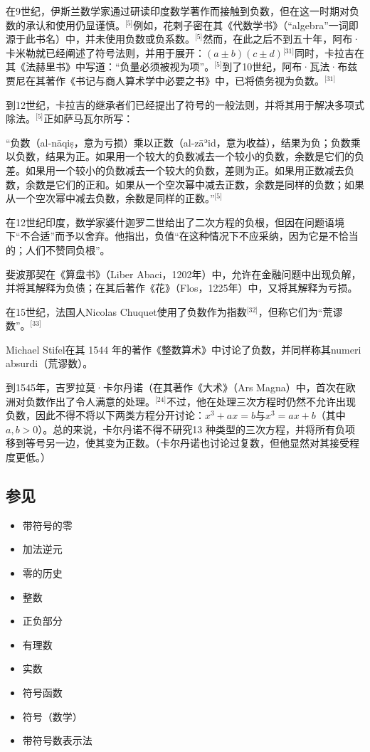 在9世纪，伊斯兰数学家通过研读印度数学著作而接触到负数，但在这一时期对负数的承认和使用仍显谨慎。\(^\text{[5]}\)例如，花剌子密在其《代数学书》（“algebra”一词即源于此书名）中，并未使用负数或负系数。\(^\text{[5]}\)然而，在此之后不到五十年，阿布·卡米勒就已经阐述了符号法则，并用于展开：$(a \pm b)(c \pm d)$\(^\text{[31]}\)同时，卡拉吉在其《法赫里书》中写道：“负量必须被视为项”。\(^\text{[5]}\)到了10世纪，阿布·瓦法·布兹贾尼在其著作《书记与商人算术学中必要之书》中，已将债务视为负数。\(^\text{[31]}\)

到12世纪，卡拉吉的继承者们已经提出了符号的一般法则，并将其用于解决多项式除法。\(^\text{[5]}\)正如萨马瓦尔所写：

“负数（al-nāqiṣ，意为亏损）乘以正数（al-zāʾid，意为收益），结果为负；负数乘以负数，结果为正。如果用一个较大的负数减去一个较小的负数，余数是它们的负差。如果用一个较小的负数减去一个较大的负数，差则为正。如果用正数减去负数，余数是它们的正和。如果从一个空次幂中减去正数，余数是同样的负数；如果从一个空次幂中减去负数，余数是同样的正数。”\(^\text{[5]}\)

在12世纪印度，数学家婆什迦罗二世给出了二次方程的负根，但因在问题语境下“不合适”而予以舍弃。他指出，负值“在这种情况下不应采纳，因为它是不恰当的；人们不赞同负根”。

斐波那契在《算盘书》（Liber Abaci，1202年）中，允许在金融问题中出现负解，并将其解释为负债；在其后著作《花》（Flos，1225年）中，又将其解释为亏损。

在15世纪，法国人Nicolas Chuquet使用了负数作为指数\(^\text{[32]}\)，但称它们为“荒谬数”。\(^\text{[33]}\)

Michael Stifel在其 1544 年的著作《整数算术》中讨论了负数，并同样称其numeri absurdi（荒谬数）。

到1545年，吉罗拉莫·卡尔丹诺（在其著作《大术》（Ars Magna）中，首次在欧洲对负数作出了令人满意的处理。\(^\text{[24]}\)不过，他在处理三次方程时仍然不允许出现负数，因此不得不将以下两类方程分开讨论：$x^{3} + ax = b$与$x^{3} = ax + b$（其中 $a, b > 0$）。总的来说，卡尔丹诺不得不研究13 种类型的三次方程，并将所有负项移到等号另一边，使其变为正数。（卡尔丹诺也讨论过复数，但他显然对其接受程度更低。）
\subsection{参见}
\begin{itemize}
\item 带符号的零
\item 加法逆元
\item 零的历史
\item 整数
\item 正负部分
\item 有理数
\item 实数
\item 符号函数
\item 符号（数学）
\item 带符号数表示法
\end{itemize}
